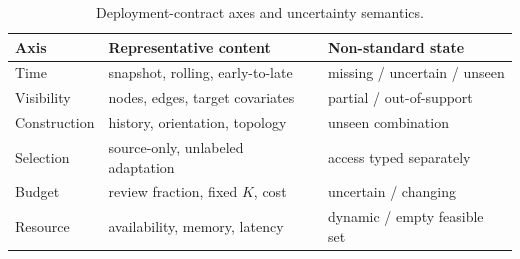 \begin{table}[t]
\centering
\caption{Deployment-contract axes and uncertainty semantics.}
\label{tab:contract-axes}
\small
\begin{tabular}{lll}
\toprule
Axis & Representative content & Non-standard state \\
\midrule
Time & snapshot, rolling, early-to-late & missing / uncertain / unseen \\
Visibility & nodes, edges, target covariates & partial / out-of-support \\
Construction & history, orientation, topology & unseen combination \\
Selection & source-only, unlabeled adaptation & access typed separately \\
Budget & review fraction, fixed $K$, cost & uncertain / changing \\
Resource & availability, memory, latency & dynamic / empty feasible set \\
\bottomrule
\end{tabular}
\end{table}
